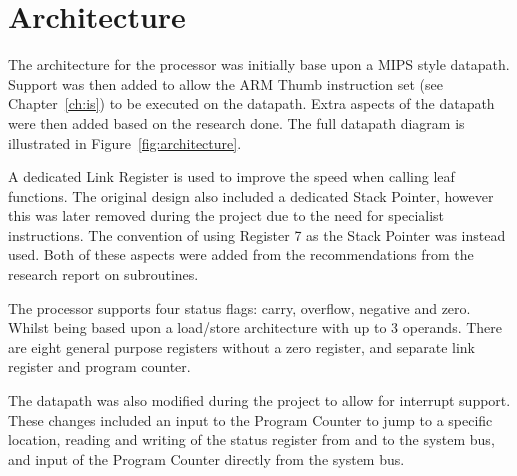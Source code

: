 

\section{Architecture}




The architecture for the processor was initially base upon a MIPS style datapath.
Support was then added to allow the ARM Thumb instruction set (see Chapter~\ref{ch:is}) to be executed on the datapath.
Extra aspects of the datapath were then added based on the research done. 
The full datapath diagram is illustrated in Figure~\ref{fig:architecture}.

A dedicated Link Register is used to improve the speed when calling leaf functions.
The original design also included a dedicated Stack Pointer, however this was later removed during the project due to the need for specialist instructions.
The convention of using Register 7 as the Stack Pointer was instead used. 
Both of these aspects were added from the recommendations from the research report on subroutines.

The processor supports four status flags: carry, overflow, negative and zero. 
Whilst being based upon a load/store architecture with up to 3 operands.
There are eight general purpose registers without a zero register, and separate link register and program counter. 

The datapath was also modified during the project to allow for interrupt support.
These changes included an input to the Program Counter to jump to a specific location, reading and writing of the status register from and to the system bus, and input of the Program Counter directly from the system bus. 


